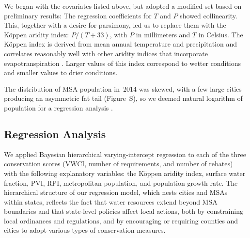 \documentclass[draft,linenumbers]{agujournal}
\begin{document}
We began with the covariates listed above, but adopted a modified set based on
preliminary results: The regression coefficients for $T$ and $P$ showed
collinearity.
This, together with a desire for parsimony, led us to replace them with the
K\"oppen aridity index: $P / (T + 33)$, with $P$ in millimeters and $T$ in
Celsius.
The K\"oppen index is
%
{derived from mean annual temperature and precipitation
and correlates reasonably well with other aridity indices
that incorporate evapotranspiration}
%
\citep{quan:aridity:2013}.
Larger values of this index correspond to wetter conditions
and smaller values to drier conditions.

The distribution of MSA population in~2014 was skewed, with
a few large cities producing an asymmetric fat tail (Figure~S),
so we deemed  natural logarithm of population
for a regression analysis \citep[pp.~59--61]{gelman:arm:2007}.


\subsection{Regression Analysis}
We applied Bayesian hierarchical varying-intercept
 regression to each of the
three conservation scores (VWCI, number of requirements, and number of rebates)
with the following explanatory variables: the K\"oppen aridity index, surface
water fraction, PVI, RPI, metropolitan population, and population growth rate.
The hierarchical structure of our regression model, which nests cities and MSAs
within states, reflects the fact that water resources extend beyond MSA
boundaries and that state-level policies affect local actions, both by
constraining local ordinances and regulations, and by encouraging or requiring
counties and cities to adopt various types of conservation measures.
\end{document}
